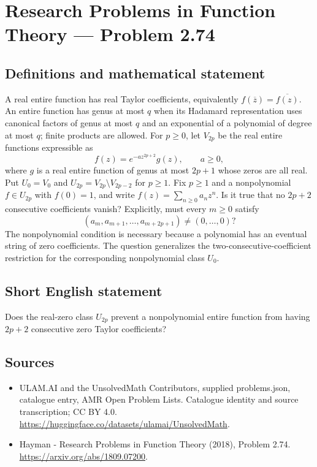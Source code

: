 \documentclass[11pt,a4paper]{article}
\begin{document}
\section*{Research Problems in Function Theory — Problem 2.74}\label{statement}

\subsection{Definitions and mathematical statement}
A real entire function has real Taylor coefficients, equivalently $f(\overline z)=\overline{f(z)}$. An entire function has genus at most $q$ when its Hadamard representation uses canonical factors of genus at most $q$ and an exponential of a polynomial of degree at most $q$; finite products are allowed.
For $p\ge0$, let $V_{2p}$ be the real entire functions expressible as
\[
f(z)=e^{-az^{2p+2}}g(z),\qquad a\ge0,
\]
where $g$ is a real entire function of genus at most $2p+1$ whose zeros are all real. Put $U_0=V_0$ and $U_{2p}=V_{2p}\setminus V_{2p-2}$ for $p\ge1$.
Fix $p\ge1$ and a nonpolynomial $f\in U_{2p}$ with $f(0)=1$, and write $f(z)=\sum_{n\ge0}a_nz^n$. Is it true that no $2p+2$ consecutive coefficients vanish? Explicitly, must every $m\ge0$ satisfy
\[
(a_m,a_{m+1},\ldots,a_{m+2p+1})\ne(0,\ldots,0)?
\]
The nonpolynomial condition is necessary because a polynomial has an eventual string of zero coefficients. The question generalizes the two-consecutive-coefficient restriction for the corresponding nonpolynomial class $U_0$.
\subsection{Short English statement}
Does the real-zero class $U_{2p}$ prevent a nonpolynomial entire function from having $2p+2$ consecutive zero Taylor coefficients?
\subsection{Sources}
\begin{itemize}
\item[S1] ULAM.AI and the UnsolvedMath Contributors, supplied problems.json, catalogue entry, AMR Open Problem Lists. Catalogue identity and source transcription; CC BY 4.0.
\url{https://huggingface.co/datasets/ulamai/UnsolvedMath}.
\item[S2] Hayman - Research Problems in Function Theory (2018), Problem 2.74. 
\url{https://arxiv.org/abs/1809.07200}.
\end{itemize}
\end{document}
